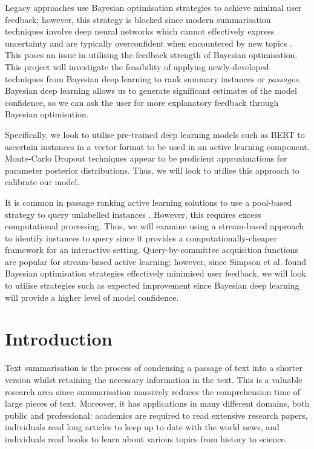 \documentclass[ %
                    author={James Stephenson},
                supervisor={Dr. Edwin Simpson},
                    degree={MSc},
                     title={PROJECT PLAN},
                  subtitle={ Bayesian Deep Learning For Extractive Test Summarisation},
                      type={},
                      year={2022}]{../additions/dissertation}
\begin{document}
		\medbreak	
		Legacy approaches use Bayesian optimisation \cite{Simpson19} strategies to achieve minimal user feedback; however, this strategy is blocked since modern summarisation techniques involve deep neural networks which cannot effectively express uncertainty and are typically overconfident when encountered by new topics \cite{Xu19}. This poses an issue in utilising the feedback strength of Bayesian optimisation. This project will investigate the feasibility of applying newly-developed techniques from Bayesian deep learning \cite{Wilson20} to rank summary instances or \emph{passages}. Bayesian deep learning allows us to generate significant estimates of the model confidence, so we can ask the user for more explanatory feedback through Bayesian optimisation.

		\medbreak		
		Specifically, we look to utilise pre-trained deep learning models such as BERT \cite{Navin21} to ascertain instances in a vector format to be used in an active learning component. Monte-Carlo Dropout \cite{Gal15} techniques appear to be proficient approximations for parameter posterior distributions. Thus, we will look to utilise this approach to calibrate our model.

		\medbreak
		It is common in passage ranking active learning solutions to use a pool-based strategy to query unlabelled instances \cite{EinDor20}. However, this requires excess computational processing. Thus, we will examine using a stream-based approach to identify instances to query since it provides a computationally-cheaper framework for an interactive setting. Query-by-committee acquisition functions are popular for stream-based active learning; however, since Simpson et al. \cite{Simpson19} found Bayesian optimisation strategies effectively minimised user feedback, we will look to utilise strategies such as expected improvement since Bayesian deep learning will provide a higher level of model confidence. 

		
		
	
	\mainmatter
	
	 
	\chapter{Introduction}
	\label{chap:introduction} 
		
		Text summarisation is the process of condensing a passage of text into a shorter version whilst retaining the necessary information in the text. This is a valuable research area since summarisation massively reduces the comprehension time of large pieces of text. Moreover, it has applications in many different domains, both public and professional: academics are required to read extensive research papers, individuals read long articles to keep up to date with the world news, and individuals read books to learn about various topics from history to science.
\end{document}
